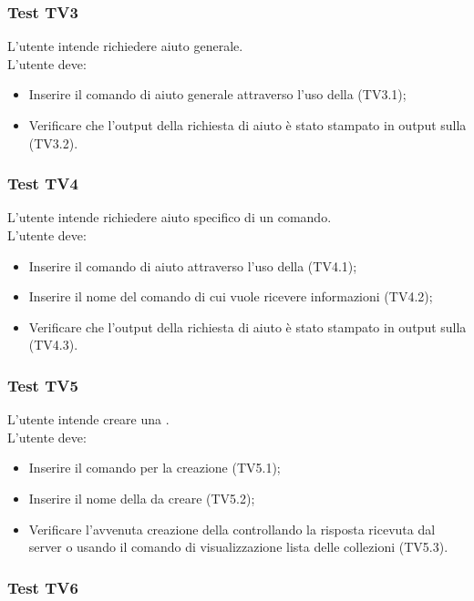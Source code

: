 \documentclass{scalatekids-article}
\begin{document}
\subsubsection{Test TV3}
\label{sec:TV3}

L'utente intende richiedere aiuto generale.\\
L'utente deve:
\begin{itemize}
\item Inserire il comando di aiuto generale attraverso l'uso della  (TV3.1);
\item Verificare che l'output della richiesta di aiuto è stato stampato in
  output sulla  (TV3.2).
\end{itemize}

\subsubsection{Test TV4}
\label{sec:TV4}

L'utente intende richiedere aiuto specifico di un comando.\\
L'utente deve:
\begin{itemize}
\item Inserire il comando di aiuto attraverso l'uso della  (TV4.1);
\item Inserire il nome del comando di cui vuole ricevere informazioni (TV4.2);
\item Verificare che l'output della richiesta di aiuto è stato stampato in
  output sulla  (TV4.3).
\end{itemize}

\subsubsection{Test TV5}

L'utente intende creare una .\\
L'utente deve:
\begin{itemize}
\item Inserire il comando per la creazione  (TV5.1);
\item Inserire il nome della  da creare (TV5.2);
\item Verificare l'avvenuta creazione della  controllando la
  risposta ricevuta dal server o usando il comando di visualizzazione
  lista delle collezioni (TV5.3).
\end{itemize}

\subsubsection{Test TV6}
\end{document}
